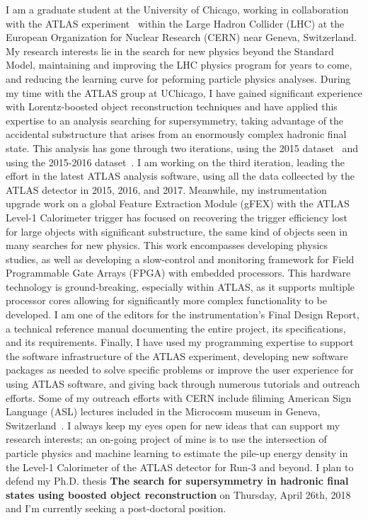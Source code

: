 \documentclass[letterpaper, 11pt]{article}
\begin{document}
\pagestyle{fancy}

I am a graduate student at the University of Chicago, working in collaboration with the ATLAS experiment~ within the Large Hadron Collider (LHC) at the European Organization for Nuclear Research (CERN) near Geneva, Switzerland. My research interests lie in the search for new physics beyond the Standard Model, maintaining and improving the LHC physics program for years to come, and reducing the learning curve for peforming particle physics analyses. During my time with the ATLAS group at UChicago, I have gained significant experience with Lorentz-boosted object reconstruction techniques and have applied this expertise to an analysis searching for supersymmetry, taking advantage of the accidental substructure that arises from an enormously complex hadronic final state. This analysis has gone through two iterations, using the 2015 dataset~\cite{SUSY-2015-10} and using the 2015-2016 dataset~\cite{SUSY-2016-10}. I am working on the third iteration, leading the effort in the latest ATLAS analysis software, using all the data colleected by the ATLAS detector in 2015, 2016, and 2017. Meanwhile, my instrumentation upgrade work on a global Feature Extraction Module (gFEX) with the ATLAS Level-1 Calorimeter trigger has focused on recovering the trigger efficiency lost for large objects with significant substructure, the same kind of objects seen in many searches for new physics. This work encompasses developing physics studies, as well as developing a slow-control and monitoring framework for Field Programmable Gate Arrays (FPGA) with embedded processors. This hardware technology is ground-breaking, especially within ATLAS, as it supports multiple processor cores allowing for significantly more complex functionality to be developed. I am one of the editors for the instrumentation's Final Design Report, a technical reference manual documenting the entire project, its specifications, and its requirements. Finally, I have used my programming expertise to support the software infrastructure of the ATLAS experiment, developing new software packages as needed to solve specific problems or improve the user experience for using ATLAS software, and giving back through numerous tutorials and outreach efforts. Some of my outreach efforts with CERN include filiming American Sign Language (ASL) lectures included in the Microcosm museum in Geneva, Switzerland~. I always keep my eyes open for new ideas that can support my research interests; an on-going project of mine is to use the intersection of particle physics and machine learning to estimate the pile-up energy density in the Level-1 Calorimeter of the ATLAS detector for Run-3 and beyond. I plan to defend my Ph.D. thesis \textbf{The search for supersymmetry in hadronic final states using boosted object reconstruction} on Thursday, April 26th, 2018 and I'm currently seeking a post-doctoral position.
\end{document}
